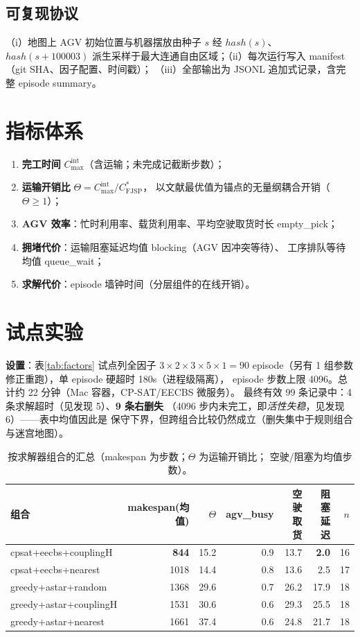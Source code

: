 \documentclass[UTF8,12pt,a4paper]{ctexart}
\newcommand{\Cmax}{C_{\max}}
\begin{document}
\subsection{可复现协议}
（i）地图上 AGV 初始位置与机器摆放由种子 $s$ 经 $hash(s)$、$hash(s{+}100003)$
派生采样于最大连通自由区域；（ii）每次运行写入 manifest（git SHA、因子配置、时间戳）；
（iii）全部输出为 JSONL 追加式记录，含完整 episode summary。

\section{指标体系}\label{sec:metrics}

\begin{enumerate}
  \item \textbf{完工时间} $\Cmax^{\text{int}}$（含运输；未完成记截断步数）；
  \item \textbf{运输开销比} $\Theta = \Cmax^{\text{int}} / C^{*}_{\text{FJSP}}$，
    以文献最优值为锚点的无量纲耦合开销（$\Theta\ge 1$）；
  \item \textbf{AGV 效率}：忙时利用率、载货利用率、平均空驶取货时长 empty\_pick；
  \item \textbf{拥堵代价}：运输阻塞延迟均值 blocking（AGV 因冲突等待）、
    工序排队等待均值 queue\_wait；
  \item \textbf{求解代价}：episode 墙钟时间（分层组件的在线开销）。
\end{enumerate}

\section{试点实验}\label{sec:pilot}

\textbf{设置}：表\ref{tab:factors} 试点列全因子 $3\times2\times3\times5\times1=90$
episode（另有 1 组参数修正重跑），单 episode 硬超时 180s（进程级隔离），
episode 步数上限 4096。总计约 22 分钟（Mac 容器，CP-SAT/EECBS 微服务）。
最终有效 99 条记录中：4 条求解超时（见发现 5）、\textbf{9 条右删失}
（4096 步内未完工，即\emph{活性失稳}，见发现 6）——表中均值因此是
保守下界，但跨组合比较仍然成立（删失集中于规则组合与迷宫地图）。

\begin{table}[h]
\centering
\begin{tabular}{lrrrrrr}
\toprule
组合 & makespan(均值) & $\Theta$ & agv\_busy & 空驶取货 & 阻塞延迟 & $n$ \\
\midrule
cpsat+eecbs+couplingH & \textbf{844} & 15.2 & 0.9 & 13.7 & \textbf{2.0} & 16 \\
cpsat+eecbs+nearest   & 1018 & 14.4 & 0.8 & 13.6 & 2.5 & 17 \\
greedy+astar+random   & 1368 & 29.6 & 0.7 & 26.2 & 17.9 & 18 \\
greedy+astar+couplingH& 1531 & 30.6 & 0.6 & 29.3 & 25.5 & 18 \\
greedy+astar+nearest  & 1661 & 37.4 & 0.6 & 24.8 & 21.7 & 18 \\
\bottomrule
\end{tabular}
\caption{按求解器组合的汇总（makespan 为步数；$\Theta$ 为运输开销比；
空驶/阻塞为均值步数）。}
\label{tab:pilotcombo}
\end{table}
\end{document}
